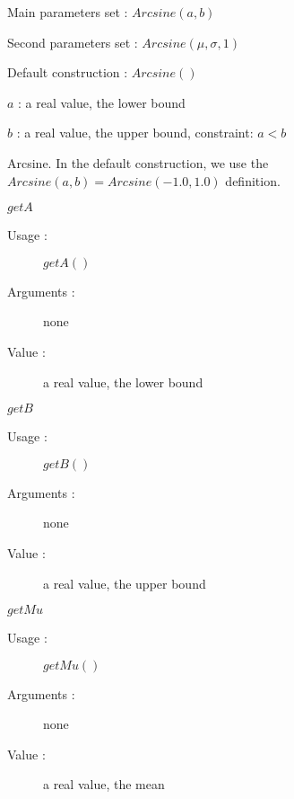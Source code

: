 \begin{description}

\item[Usage :] \rule{0pt}{1em}
  \begin{description}
  \item Main parameters set : $Arcsine(a,b)$
  \item Second parameters set : $Arcsine( \mu, \sigma,1)$
  \item Default construction : $Arcsine( )$
  \end{description}

\item[Arguments :]  \rule{0pt}{1em}
  \begin{description}
  \item $a$ : a real value, the lower bound
  \item $b$ : a real value, the upper bound, constraint: $a<b$
  \end{description}

\item[Value :]  Arcsine. In the default construction, we use the $Arcsine(a,b) = Arcsine(-1.0,1.0)$ definition.

\item[Some methods :] \rule{0pt}{1em}
  \begin{description}

  \item $getA$
    \begin{description}
    \item[Usage :] $getA()$
    \item[Arguments :] none
    \item[Value :]  a real value, the lower bound
    \end{description}
    \bigskip

  \item $getB$
    \begin{description}
    \item[Usage :] $getB()$
    \item[Arguments :] none
    \item[Value :]  a real value, the upper bound
    \end{description}

  \item $getMu$
    \begin{description}
    \item[Usage :] $getMu()$
    \item[Arguments :] none
    \item[Value :]  a real value, the mean
    \end{description}
    \bigskip


\end{description}
\end{description}
